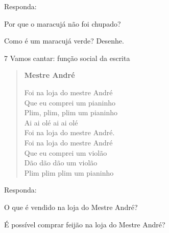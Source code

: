 
Responda:

\begin{escolha}
\item Por que o maracujá não foi chupado?


\item Como é um maracujá verde? Desenhe.

\begin{mdframed}[linewidth=2pt,linecolor=salmao,roundcorner=10pt]
\vspace{5cm}
\end{mdframed}
\end{escolha}

\num{7} Vamos cantar: função social da escrita


\begin{verse}
\textbf{Mestre André}

Foi na loja do mestre André\\
Que eu comprei um pianinho\\
Plim, plim, plim um pianinho\\
Ai ai olé ai ai olé\\
Foi na loja do mestre André.\\
Foi na loja do mestre André\\
Que eu comprei um violão\\
Dão dão dão um violão\\
Plim plim plim um pianinho
\end{verse}


Responda:

\begin{escolha}
\item O que é vendido na loja do Mestre André?


\item É possível comprar feijão na loja do Mestre André?

\end{escolha}

